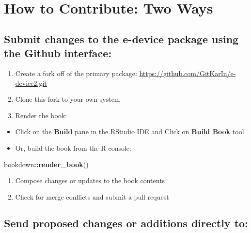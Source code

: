 \documentclass[
]{book}
\newenvironment{Shaded}{\begin{snugshade}}{\end{snugshade}}
\newcommand{\FunctionTok}[1]{\textcolor[rgb]{0.13,0.29,0.53}{\textbf{#1}}}
\newcommand{\NormalTok}[1]{#1}
\newcommand{\SpecialCharTok}[1]{\textcolor[rgb]{0.81,0.36,0.00}{\textbf{#1}}}
\begin{document}
\hypertarget{how-to-contribute-two-ways}{%
\section{How to Contribute: Two Ways}\label{how-to-contribute-two-ways}}

\hypertarget{submit-changes-to-the-e-device-package-using-the-github-interface}{%
\subsection{Submit changes to the e-device package using the Github interface:}\label{submit-changes-to-the-e-device-package-using-the-github-interface}}

\begin{enumerate}
\def\labelenumi{\arabic{enumi}.}
\item
  Create a fork off of the primary package: \url{https://github.com/GitKarIn/e-device2.git}
\item
  Clone this fork to your own system
\item
  Render the book:
\end{enumerate}

\begin{itemize}
\item
  Click on the \textbf{Build} pane in the RStudio IDE and Click on \textbf{Build Book} tool
\item
  Or, build the book from the R console:
\end{itemize}

\begin{Shaded}
\begin{Highlighting}[]
\NormalTok{bookdown}\SpecialCharTok{::}\FunctionTok{render\_book}\NormalTok{()}
\end{Highlighting}
\end{Shaded}

\begin{enumerate}
\def\labelenumi{\arabic{enumi}.}
\setcounter{enumi}{3}
\item
  Compose changes or updates to the book contents
\item
  Check for merge conflicts and submit a pull request
\end{enumerate}

\hypertarget{send-proposed-changes-or-additions-directly-to}{%
\subsection{Send proposed changes or additions directly to:}\label{send-proposed-changes-or-additions-directly-to}}
\end{document}

